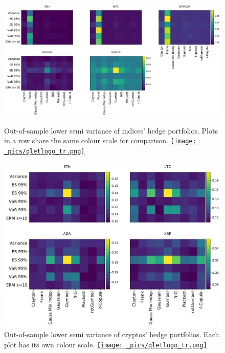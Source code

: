 \documentclass[11pt,a4paper,english]{article}
\begin{document}
\begin{landscape}
\begin{figure}[h]
\begin{minipage}[b]{0.475\linewidth}
    \centering
    \includegraphics[height=.5\linewidth]{_pics/semiVariance_indices.pdf}
    \caption{Out-of-sample lower semi variance of indices' hedge portfolios. Plots in a row share the same colour scale for comparison.
    \href{https://github.com/QuantLet/Hedging-Cryptos-with-Bitcoin-Futures/blob/main/newToQuantlet/Pynotebooks/figures/figure 6_7_8_9_10_11.ipynb}{\texttt{[image: \_pics/qletlogo\_tr.png]}}}
    \label{SLV_cryptos}
  \end{minipage}
    \hfill
  \begin{minipage}[b]{0.475\linewidth}
    \centering
    \includegraphics[height=.5\linewidth]{_pics/semiVariance_cryptos.pdf}
    \caption{Out-of-sample lower semi variance of cryptos' hedge portfolios. Each plot has its own colour scale.
    \href{https://github.com/QuantLet/Hedging-Cryptos-with-Bitcoin-Futures/blob/main/newToQuantlet/Pynotebooks/figures/figure 6_7_8_9_10_11.ipynb}{\texttt{[image: \_pics/qletlogo\_tr.png]}}}
    \label{SLV_indices}
  \end{minipage}
\end{figure}
\end{landscape}
\end{document}
